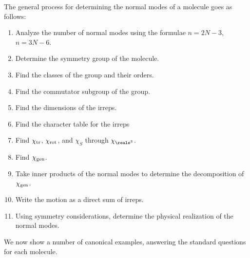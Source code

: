 \documentclass[11pt]{article}
\begin{document}
The general process for determining the normal modes of a molecule
goes as follows:
\begin{enumerate}
    \item Analyze the number of normal modes using the formulae
    $n = 2N - 3$, $n = 3N - 6$.
    \item Determine the symmetry group of the molecule.
    \item Find the classes of the group and their orders.
    \item Find the commutator subgroup of the group.
    \item Find the dimensions of the irreps.
    \item Find the character table for the irreps
    \item Find $\chi_{\rm tr}$, $\chi_{\rm rot}$, and $\chi_S$
    through $\chi_{\reals^3}$.
    \item Find $\chi_{\rm gen}$.
    \item Take inner products of the normal modes to determine
    the decomposition of $\chi_{\rm gen}$.
    \item Write the motion as a direct sum of irreps.
    \item Using symmetry considerations, determine the
    physical realization of the normal modes.
\end{enumerate}

We now show a number of canonical examples, answering the standard
questions for each molecule.
\end{document}
